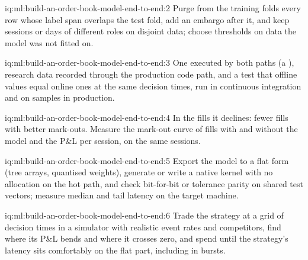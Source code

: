 \begin{solution}{iq:ml:build-an-order-book-model-end-to-end:2}
Purge from the training folds every row whose label span overlaps the test fold, add an embargo after it, and keep sessions or days
of different roles on disjoint data; choose thresholds on data the model was not fitted on.
\end{solution}

\begin{solution}{iq:ml:build-an-order-book-model-end-to-end:3}
One  executed by both paths (a ), research data recorded through the production code path, and a
test that offline values equal online ones at the same decision times, run in continuous integration and on samples in production.
\end{solution}

\begin{solution}{iq:ml:build-an-order-book-model-end-to-end:4}
In the fills it declines: fewer fills with better mark-outs. Measure the mark-out curve of fills with and without the model and the
P\&L per session, on the same sessions.
\end{solution}

\begin{solution}{iq:ml:build-an-order-book-model-end-to-end:5}
Export the model to a flat form (tree arrays, quantised weights), generate or write a native kernel with no allocation on the hot
path, and check bit-for-bit or tolerance parity on shared test vectors; measure median and tail latency on the target machine.
\end{solution}

\begin{solution}{iq:ml:build-an-order-book-model-end-to-end:6}
Trade the strategy at a grid of decision times in a simulator with realistic event rates and competitors, find where its P\&L
bends and where it crosses zero, and spend until the strategy's latency sits comfortably on the flat part, including in bursts.
\end{solution}

